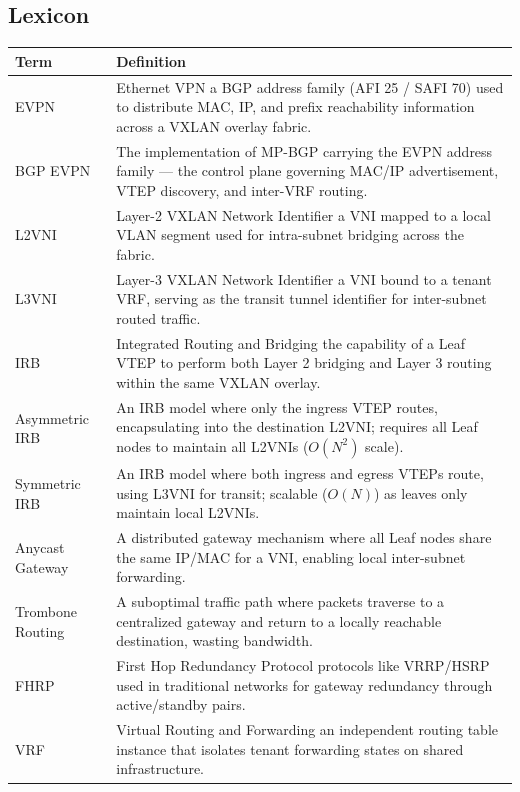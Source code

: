 \subsection{Lexicon}
\newpage
\begin{table}[!htbp]
    \centering
    \begin{tabularx}{\textwidth}{l X}
        \toprule
        \textbf{Term} & \textbf{Definition} \\
        \midrule
        EVPN & Ethernet VPN a BGP address family (AFI 25 / SAFI 70) used to distribute MAC, IP, and prefix reachability information across a VXLAN overlay fabric. \\ \midrule
        BGP EVPN & The implementation of MP-BGP carrying the EVPN address family — the control plane governing MAC/IP advertisement, VTEP discovery, and inter-VRF routing. \\ \midrule
        L2VNI & Layer-2 VXLAN Network Identifier a VNI mapped to a local VLAN segment used for intra-subnet bridging across the fabric. \\ \midrule
        L3VNI & Layer-3 VXLAN Network Identifier a VNI bound to a tenant VRF, serving as the transit tunnel identifier for inter-subnet routed traffic. \\ \midrule
        IRB & Integrated Routing and Bridging the capability of a Leaf VTEP to perform both Layer 2 bridging and Layer 3 routing within the same VXLAN overlay. \\ \midrule
        Asymmetric IRB & An IRB model where only the ingress VTEP routes, encapsulating into the destination L2VNI; requires all Leaf nodes to maintain all L2VNIs ($O(N^2)$ scale). \\ \midrule
        Symmetric IRB & An IRB model where both ingress and egress VTEPs route, using L3VNI for transit; scalable ($O(N)$) as leaves only maintain local L2VNIs. \\ \midrule
        Anycast Gateway & A distributed gateway mechanism where all Leaf nodes share the same IP/MAC for a VNI, enabling local inter-subnet forwarding. \\ \midrule
        Trombone Routing & A suboptimal traffic path where packets traverse to a centralized gateway and return to a locally reachable destination, wasting bandwidth. \\ \midrule
        FHRP & First Hop Redundancy Protocol protocols like VRRP/HSRP used in traditional networks for gateway redundancy through active/standby pairs. \\ \midrule
        VRF & Virtual Routing and Forwarding an independent routing table instance that isolates tenant forwarding states on shared infrastructure. \\ \midrule

\end{tabularx}
\end{table}
